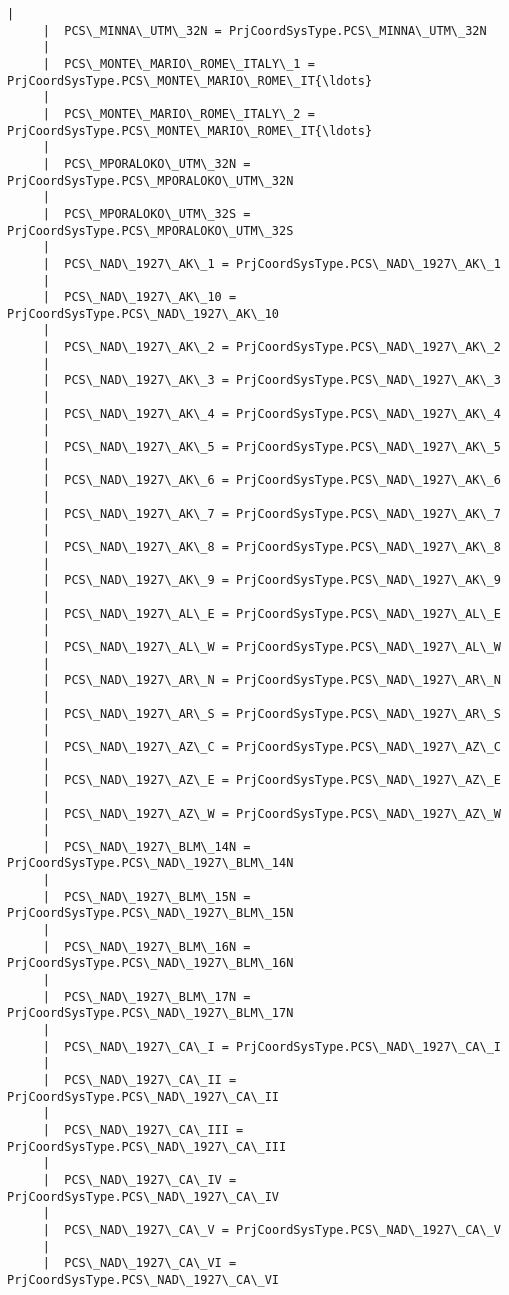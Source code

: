 \documentclass[11pt]{article}
\begin{document}
\begin{Verbatim}[commandchars=\\\{\}]
     |  
     |  PCS\_MINNA\_UTM\_32N = PrjCoordSysType.PCS\_MINNA\_UTM\_32N
     |  
     |  PCS\_MONTE\_MARIO\_ROME\_ITALY\_1 = PrjCoordSysType.PCS\_MONTE\_MARIO\_ROME\_IT{\ldots}
     |  
     |  PCS\_MONTE\_MARIO\_ROME\_ITALY\_2 = PrjCoordSysType.PCS\_MONTE\_MARIO\_ROME\_IT{\ldots}
     |  
     |  PCS\_MPORALOKO\_UTM\_32N = PrjCoordSysType.PCS\_MPORALOKO\_UTM\_32N
     |  
     |  PCS\_MPORALOKO\_UTM\_32S = PrjCoordSysType.PCS\_MPORALOKO\_UTM\_32S
     |  
     |  PCS\_NAD\_1927\_AK\_1 = PrjCoordSysType.PCS\_NAD\_1927\_AK\_1
     |  
     |  PCS\_NAD\_1927\_AK\_10 = PrjCoordSysType.PCS\_NAD\_1927\_AK\_10
     |  
     |  PCS\_NAD\_1927\_AK\_2 = PrjCoordSysType.PCS\_NAD\_1927\_AK\_2
     |  
     |  PCS\_NAD\_1927\_AK\_3 = PrjCoordSysType.PCS\_NAD\_1927\_AK\_3
     |  
     |  PCS\_NAD\_1927\_AK\_4 = PrjCoordSysType.PCS\_NAD\_1927\_AK\_4
     |  
     |  PCS\_NAD\_1927\_AK\_5 = PrjCoordSysType.PCS\_NAD\_1927\_AK\_5
     |  
     |  PCS\_NAD\_1927\_AK\_6 = PrjCoordSysType.PCS\_NAD\_1927\_AK\_6
     |  
     |  PCS\_NAD\_1927\_AK\_7 = PrjCoordSysType.PCS\_NAD\_1927\_AK\_7
     |  
     |  PCS\_NAD\_1927\_AK\_8 = PrjCoordSysType.PCS\_NAD\_1927\_AK\_8
     |  
     |  PCS\_NAD\_1927\_AK\_9 = PrjCoordSysType.PCS\_NAD\_1927\_AK\_9
     |  
     |  PCS\_NAD\_1927\_AL\_E = PrjCoordSysType.PCS\_NAD\_1927\_AL\_E
     |  
     |  PCS\_NAD\_1927\_AL\_W = PrjCoordSysType.PCS\_NAD\_1927\_AL\_W
     |  
     |  PCS\_NAD\_1927\_AR\_N = PrjCoordSysType.PCS\_NAD\_1927\_AR\_N
     |  
     |  PCS\_NAD\_1927\_AR\_S = PrjCoordSysType.PCS\_NAD\_1927\_AR\_S
     |  
     |  PCS\_NAD\_1927\_AZ\_C = PrjCoordSysType.PCS\_NAD\_1927\_AZ\_C
     |  
     |  PCS\_NAD\_1927\_AZ\_E = PrjCoordSysType.PCS\_NAD\_1927\_AZ\_E
     |  
     |  PCS\_NAD\_1927\_AZ\_W = PrjCoordSysType.PCS\_NAD\_1927\_AZ\_W
     |  
     |  PCS\_NAD\_1927\_BLM\_14N = PrjCoordSysType.PCS\_NAD\_1927\_BLM\_14N
     |  
     |  PCS\_NAD\_1927\_BLM\_15N = PrjCoordSysType.PCS\_NAD\_1927\_BLM\_15N
     |  
     |  PCS\_NAD\_1927\_BLM\_16N = PrjCoordSysType.PCS\_NAD\_1927\_BLM\_16N
     |  
     |  PCS\_NAD\_1927\_BLM\_17N = PrjCoordSysType.PCS\_NAD\_1927\_BLM\_17N
     |  
     |  PCS\_NAD\_1927\_CA\_I = PrjCoordSysType.PCS\_NAD\_1927\_CA\_I
     |  
     |  PCS\_NAD\_1927\_CA\_II = PrjCoordSysType.PCS\_NAD\_1927\_CA\_II
     |  
     |  PCS\_NAD\_1927\_CA\_III = PrjCoordSysType.PCS\_NAD\_1927\_CA\_III
     |  
     |  PCS\_NAD\_1927\_CA\_IV = PrjCoordSysType.PCS\_NAD\_1927\_CA\_IV
     |  
     |  PCS\_NAD\_1927\_CA\_V = PrjCoordSysType.PCS\_NAD\_1927\_CA\_V
     |  
     |  PCS\_NAD\_1927\_CA\_VI = PrjCoordSysType.PCS\_NAD\_1927\_CA\_VI

\end{Verbatim}
\end{document}
